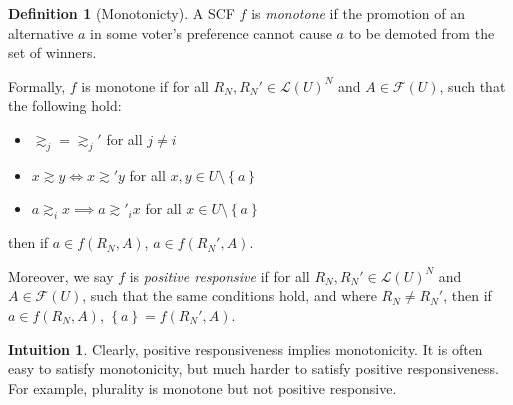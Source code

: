 \documentclass{book}
\theoremstyle{plain}
\theoremstyle{definition}
\newtheorem{definition}[theorem]{Definition}
\newtheorem{intuition}[theorem]{Intuition}
\theoremstyle{remark}
\newcommand{\set}[1]{\left\{#1\right\}}
\begin{document}
\begin{definition}[Monotonicty]
    A SCF $f$ is \emph{monotone} if the promotion
    of an alternative $a$ in some voter's preference cannot cause $a$ to be demoted from the 
    set of winners.

    Formally, 
    $f$ is monotone if 
    for all $R_N, R_N' \in \mathcal{L}(U)^N$ and $A \in \mathcal{F}(U)$,
    such that the following hold:
    \begin{itemize}
        \item $\gtrsim_j = \gtrsim_j'$ for all $j \neq i$
        \item $x \gtrsim y \iff x \gtrsim' y$ for all $x, y \in U \setminus \set{a}$
        \item $a \gtrsim_i x \implies a \gtrsim'_i x$ for all $x \in U \setminus \set{a}$
    \end{itemize}
    then if $a \in f(R_N, A)$, $a \in f(R_N', A)$.

    Moreover, 
    we say $f$ is \emph{positive responsive} if 
    for all $R_N, R_N' \in \mathcal{L}(U)^N$ and $A \in \mathcal{F}(U)$,
    such that the same conditions hold, and where $R_N \neq R_N'$, 
    then if $a \in f(R_N, A)$, $\set{a} = f(R_N', A)$.
\end{definition}

\begin{intuition}
    Clearly, positive responsiveness implies monotonicity.
    It is often easy to 
    satisfy 
    monotonicity, but much harder to satisfy positive responsiveness.
    For example, plurality is monotone but not positive responsive.
\end{intuition}
\end{document}
